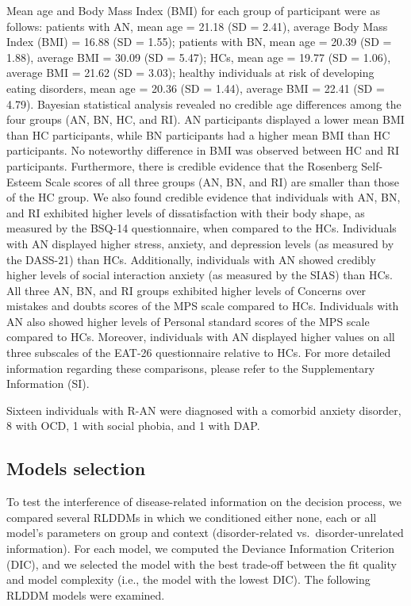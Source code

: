 \documentclass[
  man,floatsintext]{apa6}
\begin{document}
Mean age and Body Mass Index (BMI) for each group of participant were as follows: patients with AN, mean age = 21.18 (SD = 2.41), average Body Mass Index (BMI) = 16.88 (SD = 1.55); patients with BN, mean age = 20.39 (SD = 1.88), average BMI = 30.09 (SD = 5.47); HCs, mean age = 19.77 (SD = 1.06), average BMI = 21.62 (SD = 3.03); healthy individuals at risk of developing eating disorders, mean age = 20.36 (SD = 1.44), average BMI = 22.41 (SD = 4.79).
Bayesian statistical analysis revealed no credible age differences among the four groups (AN, BN, HC, and RI). AN participants displayed a lower mean BMI than HC participants, while BN participants had a higher mean BMI than HC participants. No noteworthy difference in BMI was observed between HC and RI participants. Furthermore, there is credible evidence that the Rosenberg Self-Esteem Scale scores of all three groups (AN, BN, and RI) are smaller than those of the HC group. We also found credible evidence that individuals with AN, BN, and RI exhibited higher levels of dissatisfaction with their body shape, as measured by the BSQ-14 questionnaire, when compared to the HCs.
Individuals with AN displayed higher stress, anxiety, and depression levels (as measured by the DASS-21) than HCs. Additionally, individuals with AN showed credibly higher levels of social interaction anxiety (as measured by the SIAS) than HCs. All three AN, BN, and RI groups exhibited higher levels of Concerns over mistakes and doubts scores of the MPS scale compared to HCs. Individuals with AN also showed higher levels of Personal standard scores of the MPS scale compared to HCs. Moreover, individuals with AN displayed higher values on all three subscales of the EAT-26 questionnaire relative to HCs. For more detailed information regarding these comparisons, please refer to the Supplementary Information (SI).

Sixteen individuals with R-AN were diagnosed with a comorbid anxiety disorder, 8 with OCD, 1 with social phobia, and 1 with DAP.

\hypertarget{models-selection}{%
\subsection{Models selection}\label{models-selection}}

To test the interference of disease-related information on the decision process, we compared several RLDDMs in which we conditioned either none, each or all model's parameters on group and context (disorder-related vs.~disorder-unrelated information). For each model, we computed the Deviance Information Criterion (DIC), and we selected the model with the best trade-off between the fit quality and model complexity (i.e., the model with the lowest DIC). The following RLDDM models were examined.
\end{document}
